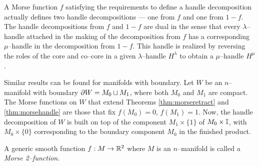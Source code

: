 A Morse function $f$ satisfying the requirements to define a handle decomposition actually defines two handle decompositions --- one from $f$ and one from $1-f$.
The handle decompositions from $f$ and $1-f$ are dual in the sense that every $\lambda$--handle attached in the making of the decomposition from $f$ has a corresponding $\mu$--handle in the decomposition from $1-f$.
This handle is realized by reversing the roles of the core and co--core in a given $\lambda$--handle $H^\lambda$ to obtain a $\mu$--handle $H^\mu$.

Similar results can be found for manifolds with boundary.
Let $W$ be an $n$--manifold with boundary $\partial W = M_0\sqcup M_1$, where both $M_0$ and $M_1$ are compact.
The Morse functions on $W$ that extend Theorems \ref{thm:morseretract} and \ref{thm:morsehandle} are those that fix $f(M_0)=0$, $f(M_1)=1$.
Now, the handle decomposition of $W$ is built on top of the component $M_1\times\{1\}$ of $M_0\times\mathbb{I}$, with $M_0\times\{0\}$ corresponding to the boundary component $M_0$ in the finished product.

\begin{defn}
  \label{def:morse2function}
  A generic smooth function $f:M\to\mathbb{R}^2$ where $M$ is an $n$--manifold is called a \emph{Morse 2--function}.
\end{defn}

\begin{defn}
  \label{def:steinfactorization}
\end{defn}

\begin{defn}
  \label{def:steincomplex}
\end{defn}
